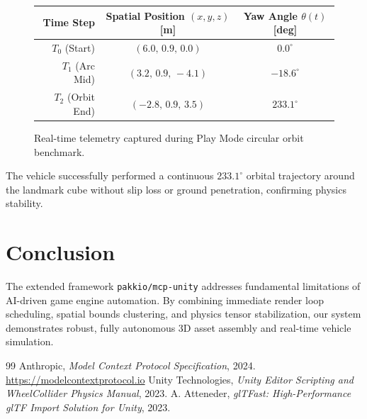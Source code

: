 \documentclass[11pt,a4paper]{article}
\begin{document}
\begin{figure}[h!]
\centering
\small
\begin{tabular}{rcc}
\toprule
\textbf{Time Step} & \textbf{Spatial Position } $(x,y,z)$ [m] & \textbf{Yaw Angle } $\theta(t)$ [deg] \\
\midrule
$T_0$ (Start) & $(6.0,\, 0.9,\, 0.0)$ & $0.0^\circ$ \\
$T_1$ (Arc Mid) & $(3.2,\, 0.9,\, -4.1)$ & $-18.6^\circ$ \\
$T_2$ (Orbit End) & $(-2.8,\, 0.9,\, 3.5)$ & \textbf{$233.1^\circ$} \\
\bottomrule
\end{tabular}
\caption{Real-time telemetry captured during Play Mode circular orbit benchmark.}
\end{figure}

The vehicle successfully performed a continuous $233.1^\circ$ orbital trajectory around the landmark cube without slip loss or ground penetration, confirming physics stability.

\section{Conclusion}
The extended framework \texttt{pakkio/mcp-unity} addresses fundamental limitations of AI-driven game engine automation. By combining immediate render loop scheduling, spatial bounds clustering, and physics tensor stabilization, our system demonstrates robust, fully autonomous 3D asset assembly and real-time vehicle simulation.

\begin{thebibliography}{99}
 Anthropic, \textit{Model Context Protocol Specification}, 2024. \url{https://modelcontextprotocol.io}
 Unity Technologies, \textit{Unity Editor Scripting and WheelCollider Physics Manual}, 2023.
 A. Atteneder, \textit{glTFast: High-Performance glTF Import Solution for Unity}, 2023.
\end{thebibliography}
\end{document}
